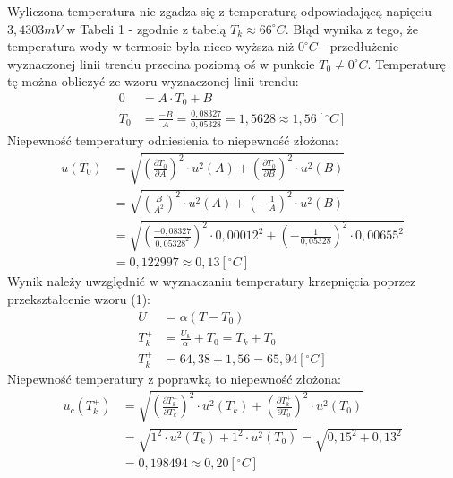 \documentclass[polish, 11pt, a4paper]{article}
\begin{document}
		Wyliczona temperatura nie zgadza się z temperaturą odpowiadającą napięciu \(3,4303mV\) w Tabeli 1 - zgodnie z tabelą \(T_k\approx 66^\circ C\). Błąd wynika z tego, że temperatura wody w termosie była nieco wyższa niż \(0^\circ C\) - przedłużenie wyznaczonej linii trendu przecina poziomą oś w punkcie \(T_0\neq 0^\circ C\). Temperaturę tę można obliczyć ze wzoru wyznaczonej linii trendu:
		\begin{align*}
			0	&=	A\cdot T_0 + B\\[4pt]
			T_0	&=	\frac{-B}{A} = \frac{0,08327}{0,05328} = 1,5628 \approx 1,56 [^\circ C]
		\end{align*}
		Niepewność temperatury odniesienia to niepewność złożona:
		\begin{align*}
		u(T_0)	&=\sqrt{\left(\frac{\partial T_0}{\partial A}\right)^2\cdot u^2(A)+\left(\frac{\partial T_0}{\partial B}\right)^2\cdot u^2(B)}\\
		&=\sqrt{\left(\frac{B}{A^2}\right)^2\cdot u^2(A) + \left(-\frac{1}{A}\right)^2\cdot u^2(B)}\\
		&=\sqrt{\left(\frac{-0,08327}{0,05328^2}\right)^2\cdot 0,00012^2 + \left(-\frac{1}{0,05328}\right)^2\cdot 0,00655^2}\\[10pt]
		&=0,122997\approx 0,13[^\circ C]
		\end{align*}
		Wynik należy uwzględnić w wyznaczaniu temperatury krzepnięcia poprzez przekształcenie wzoru (1):
		\begin{align*}
		U	&=\alpha(T-T_0)\\[4pt]
		T_{k}^+	&=\frac{U_k}{\alpha}+T_0 = T_k + T_0\\[4pt]
		T_{k}^+	&=64,38 + 1,56 = 65,94 [^\circ C]
		\end{align*}
		Niepewność temperatury z poprawką to niepewność złożona:
		\begin{align*}
			u_c(T_k^+)	&=\sqrt{\left(\frac{\partial T_k^+}{\partial T_k}\right)^2\cdot u^2(T_k)+\left(\frac{\partial T_k^+}{\partial T_0}\right)^2\cdot u^2(T_0)}\\[4pt]
			&=\sqrt{1^2\cdot u^2(T_k) +1^2\cdot u^2(T_0)}
			 =\sqrt{0,15^2 + 0,13^2}\\[4pt]
			&=0,198494\approx 0,20[^\circ C]
		\end{align*}
		
	\newpage
\end{document}
